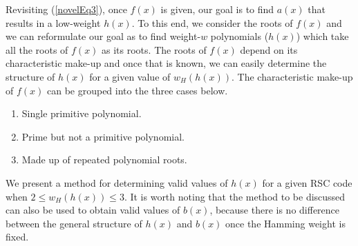
Revisiting (\ref{novelEq3}), once $f(x)$ is given, our goal is to find $a(x)$ that results in a low-weight $h(x)$. To this end, we consider the roots of $f(x)$ 
and we can reformulate our goal as to find weight-$w$ polynomials ($h(x)$) which take all the roots of $f(x)$ as its roots. The roots of $f(x)$ depend on its characteristic make-up and once that is known, we can easily determine the structure of $h(x)$ for a given value of $w_H(h(x))$. 
The characteristic make-up of $f(x)$ can be grouped into the three cases below. 
\begin{enumerate}
\item Single primitive polynomial.
\item Prime but not a primitive polynomial.
\item Made up of repeated polynomial roots.
\end{enumerate}
We present a method for determining valid values of $h(x)$ for a given RSC code when $2 \leq w_H(h(x))\leq 3$. It is worth noting that the method to be discussed can also be used to obtain valid values of $b(x)$, because there is no difference between the general structure of $h(x)$ and $b(x)$ once the Hamming weight is fixed. 